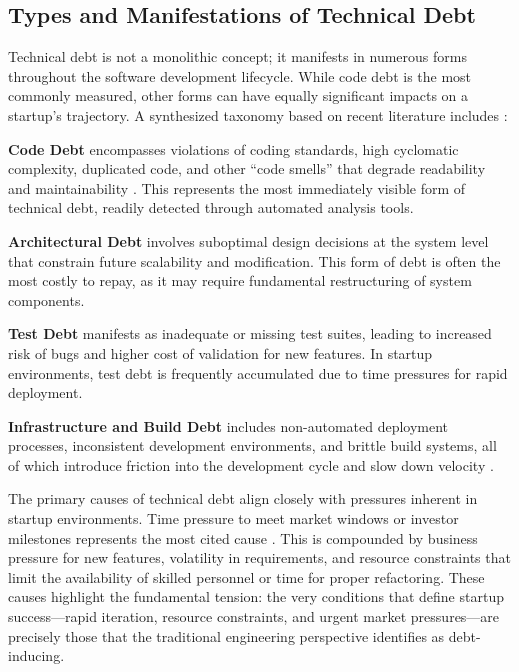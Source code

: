 \subsection{Types and Manifestations of Technical Debt}

Technical debt is not a monolithic concept; it manifests in numerous forms throughout the software development lifecycle. While code debt is the most commonly measured, other forms can have equally significant impacts on a startup's trajectory. A synthesized taxonomy based on recent literature includes \citep{morgenthaler2012searching}:

\textbf{Code Debt} encompasses violations of coding standards, high cyclomatic complexity, duplicated code, and other ``code smells'' that degrade readability and maintainability \citep{arcelli2012investigating}. This represents the most immediately visible form of technical debt, readily detected through automated analysis tools.

\textbf{Architectural Debt} involves suboptimal design decisions at the system level that constrain future scalability and modification. This form of debt is often the most costly to repay, as it may require fundamental restructuring of system components.

\textbf{Test Debt} manifests as inadequate or missing test suites, leading to increased risk of bugs and higher cost of validation for new features. In startup environments, test debt is frequently accumulated due to time pressures for rapid deployment.

\textbf{Infrastructure and Build Debt} includes non-automated deployment processes, inconsistent development environments, and brittle build systems, all of which introduce friction into the development cycle and slow down velocity \citep{morgenthaler2012searching}.

The primary causes of technical debt align closely with pressures inherent in startup environments. Time pressure to meet market windows or investor milestones represents the most cited cause \citep{li2015systematic}. This is compounded by business pressure for new features, volatility in requirements, and resource constraints that limit the availability of skilled personnel or time for proper refactoring. These causes highlight the fundamental tension: the very conditions that define startup success—rapid iteration, resource constraints, and urgent market pressures—are precisely those that the traditional engineering perspective identifies as debt-inducing.

